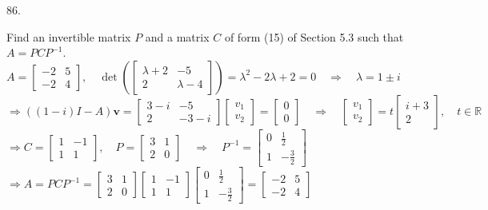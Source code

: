 \documentclass[12pt]{book}
\begin{document}
\begin{CJK}{UTF8}{bsmi}
86. \begin{minipage}[t]{\dimexpr\linewidth}
Find an invertible matrix $P$ and a matrix $C$ of form (15) of Section 5.3 such that $A=PCP^{-1}$. \\
$A=\begin{bmatrix}
-2 & 5 \\
-2 & 4
\end{bmatrix},\quad\det(\begin{bmatrix}
\lambda+2 & -5 \\
2 & \lambda-4
\end{bmatrix})=\lambda^2-2\lambda+2=0\quad\Rightarrow\quad\lambda=1\pm i$ \\
$\Rightarrow((1-i)I-A)\textbf{v}=\begin{bmatrix}
3-i & -5 \\
2 & -3-i
\end{bmatrix}\begin{bmatrix}
v_1 \\ v_2
\end{bmatrix}=\begin{bmatrix}
0 \\ 0
\end{bmatrix}\quad\Rightarrow\quad\begin{bmatrix}
v_1 \\ v_2
\end{bmatrix}=t\begin{bmatrix}
i+3 \\ 2
\end{bmatrix},\quad t\in\mathbb{R}$ \\
$\Rightarrow C=\begin{bmatrix}
1 & -1 \\
1 & 1
\end{bmatrix},\quad P=\begin{bmatrix}
3 & 1 \\
2 & 0
\end{bmatrix}\quad\Rightarrow\quad P^{-1}=\begin{bmatrix}
0 & \frac{1}{2} \\
1 & -\frac{3}{2}
\end{bmatrix}$ \\
$\Rightarrow A=PCP^{-1}=\begin{bmatrix}
3 & 1 \\
2 & 0
\end{bmatrix}\begin{bmatrix}
1 & -1 \\
1 & 1
\end{bmatrix}\begin{bmatrix}
0 & \frac{1}{2} \\
1 & -\frac{3}{2}
\end{bmatrix}=\begin{bmatrix}
-2 & 5 \\
-2 & 4
\end{bmatrix}$
\end{minipage} \\


\end{CJK}
\end{document}
